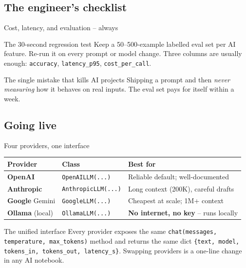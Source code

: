 \documentclass[aspectratio=169,11pt]{beamer}
\begin{document}
\subsection{The engineer's checklist}

\begin{frame}{Cost, latency, and evaluation -- always}
  \begin{block}{The 30-second regression test}
    Keep a 50--500-example labelled eval set per AI feature. Re-run it on every
    prompt or model change. Three columns are usually enough:
    \texttt{accuracy}, \texttt{latency\_p95}, \texttt{cost\_per\_call}.
  \end{block}
  \vspace{6pt}
  \begin{alertblock}{The single mistake that kills AI projects}
    Shipping a prompt and then \emph{never measuring} how it behaves on real
    inputs. The eval set pays for itself within a week.
  \end{alertblock}
\end{frame}

\subsection{Going live}

\begin{frame}{Four providers, one interface}
  \footnotesize
  \begin{tabular}{@{}lll@{}}
    \toprule
    \textbf{Provider} & \textbf{Class} & \textbf{Best for} \\
    \midrule
    \textcolor{codegreen}{\textbf{OpenAI}}
        & \texttt{OpenAILLM(...)}
        & Reliable default; well-documented \\
    \textcolor{codeblue}{\textbf{Anthropic}}
        & \texttt{AnthropicLLM(...)}
        & Long context (200K), careful drafts \\
    \textcolor{codeblue}{\textbf{Google} Gemini}
        & \texttt{GoogleLLM(...)}
        & Cheapest at scale; 1M+ context \\
    \textbf{Ollama} (local)
        & \texttt{OllamaLLM(...)}
        & \textbf{No internet, no key} -- runs locally \\
    \bottomrule
  \end{tabular}
  \vspace{8pt}
  \begin{block}{The unified interface}
    Every provider exposes the same
    \texttt{chat(messages, temperature, max\_tokens)} method and returns the
    same dict \texttt{\{text, model, tokens\_in, tokens\_out, latency\_s\}}.
    Swapping providers is a one-line change in any AI notebook.
  \end{block}
\end{frame}
\end{document}
